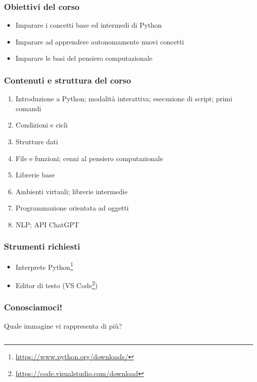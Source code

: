 
\begin{contentframe}
    \frametitle{Obiettivi del corso}

    \begin{itemize}
        \item Imparare i concetti base ed intermedi di Python
        
        \bigskip
        \item Imparare ad apprendere autonomamente nuovi concetti

        \bigskip
        \item Imparare le basi del pensiero computazionale
    \end{itemize}
\end{contentframe}

\begin{contentframe}
    \frametitle{Contenuti e struttura del corso}

    \begin{enumerate}
        \item Introduzione a Python; modalità interattiva; esecuzione di script; primi comandi
        \item Condizioni e cicli
        \item Strutture dati
        \item File e funzioni; cenni al pensiero computazionale
        \item Librerie base
        \item Ambienti virtuali; librerie intermedie
        \item Programmazione orientata ad oggetti
        \item NLP; API ChatGPT
    \end{enumerate}
\end{contentframe}

\begin{contentframe}
    \frametitle{Strumenti richiesti}

    \begin{itemize}    
        \item Interprete Python\footnote[frame]{\url{https://www.python.org/downloads/}}
        \item Editor di testo (VS Code\footnote[frame]{\url{https://code.visualstudio.com/download}})
    \end{itemize}
\end{contentframe}

\begin{contentframe}
    \frametitle{Conosciamoci!}
    
    Quale immagine vi rappresenta di più?

    \bigskip
    \begin{columns}
        \centering
        
        \centering
        
        \centering
    \end{columns}
\end{contentframe}

